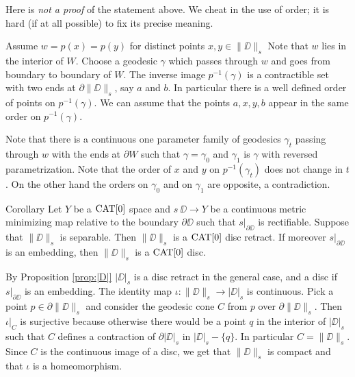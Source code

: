 \documentclass[a4paper,10pt]{amsart}
\begin{document}
Here is \emph{not a proof} of the statement above.
We cheat in the use of order; 
it is hard (if at all possible) to fix its precise meaning.

 Assume  $w=p(x)=p(y)$ for distinct points $x,y\in\|\DD\|_s$
Note that  $w$ lies in the interior of $W$.
Choose a geodesic $\gamma$ which passes through $w$ and goes 
from boundary to boundary of $W$.
The inverse image $p^{-1}(\gamma)$ is a contractible set with two ends at $\partial\|\DD\|_s$, say $a$ and $b$.
In particular there is a well defined order of  points on $p^{-1}(\gamma)$.
We can assume that the points $a,x,y,b$ appear in the same order on $p^{-1}(\gamma)$. 

Note that there is a continuous one parameter family of geodesics $\gamma_t$ passing through $w$ with the ends at $\partial W$
such that $\gamma=\gamma_0$ and $\gamma_1$ is $\gamma$ with reversed parametrization.
Note that the order of $x$ and $y$ on $p^{-1}(\gamma_t)$ does not change in $t$.
On the other hand the orders on $\gamma_0$ and on $\gamma_1$ are opposite, a contradiction.\qeds 

\begin{thm}{Corollary}\label{cor:main}
Let $Y$ be a $\mathop{\rm CAT}\nolimits[0]$ space 
and $s\:\DD\to Y$ be a continuous metric minimizing map relative to the boundary $\partial\DD$ such that $s|_{\partial\DD}$ is rectifiable.
Suppose that $\|\DD\|_s$  is separable. Then $\|\DD\|_s$ is a $\mathop{\rm CAT}\nolimits[0]$ disc retract. If moreover  $s|_{\partial\DD}$ is an embedding,
then $\|\DD\|_s$ is a $\mathop{\rm CAT}\nolimits[0]$ disc.
\end{thm}

By Proposition \ref{prop:|D|} $|\DD|_s$ is a disc retract in the general case, and a disc if $s|_{\partial\DD}$ is an embedding.
The identity map $\iota:\|\DD\|_s\to |\DD|_s$ is continuous. Pick a point $p\in\partial\|\DD\|_s$ and consider the geodesic 
cone $C$ from $p$ over $\partial\|\DD\|_s$. Then $\iota|_C$ is surjective because otherwise there would be a point $q$ in the 
interior of $|\DD|_s$ such that $C$ defines a contraction of $\partial|\DD|_s$ in $|\DD|_s-\{q\}$. In particular $C=\|\DD\|_s$.
Since $C$ is the continuous image of a disc, we get that $\|\DD\|_s$ is compact and that $\iota$ is a homeomorphism.
\qeds
\end{document}

